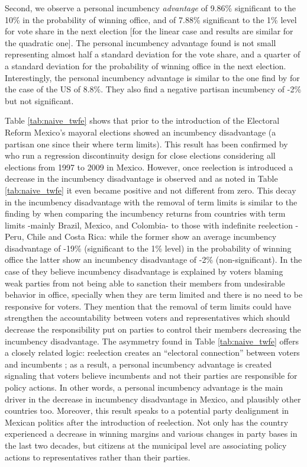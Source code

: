 Second, we observe a personal incumbency \emph{advantage} of 9.86\% significant to the 10\% in the probability of winning office, and of 7.88\% significant to the 1\% level for vote share in the next election [for the linear case and results are similar for the quadratic one]. The personal incumbency advantage found is not small representing almost half a standard deviation for the vote share, and a quarter of a standard deviation for the probability of winning office in the next election. Interestingly, the personal incumbency advantage is similar to the one find by \citet{fowler_hall_2014} for the case of the US of 8.8\%. They also find a negative partisan incumbency of -2\% but not significant.  

Table \ref{tab:naive_twfe} shows that prior to the introduction of the Electoral Reform Mexico's mayoral elections showed an incumbency disadvantage (a partisan one since their where term limits). This result has been confirmed by \citet{klasnja_titiunik_2017} who run a regression discontinuity design for close elections considering all elections from 1997 to 2009 in Mexico. However, once reelection is introduced a decrease in the incumbency disadvantage is observed and as noted in Table \ref{tab:naive_twfe} it even became positive and not different from zero. This decay in the incumbency disadvantage with the removal of term limits is similar to the finding by \citet{klasnja_titiunik_2017} when comparing the incumbency returns from countries with term limits -mainly Brazil, Mexico, and Colombia-  to those with indefinite reelection -Peru, Chile and Costa Rica: while the former show an average incumbency disadvantage of -19\% (significant to the 1\% level) in the probability of winning office the latter show an incumbency disadvantage of -2\% (non-significant). In the case of \citet{klasnja_titiunik_2017} they believe incumbency disadvantage is explained by voters blaming weak parties from not being able to sanction their members from undesirable behavior in office, specially when they are term limited and there is no need to be responsive for voters. They mention that the removal of term limits could have strengthen the accountability between voters and representatives which should decrease the responsibility put on parties to control their members decreasing the incumbency disadvantage. The asymmetry found in Table \ref{tab:naive_twfe} offers a closely related logic: reelection creates an ``electoral connection'' between voters and incumbents \citep{mayhew_1974}; as a result, a personal incumbency advantage is created signaling that voters believe incumbents and not their parties are responsible for policy actions. In other words, a personal incumbency advantage is the main driver in the decrease in incumbency disadvantage in Mexico, and plausibly other countries too. Moreover, this result speaks to a potential party dealignment in Mexican politics after the introduction of reelection. Not only has the country experienced a decrease in winning margins and various changes in party bases in the last two decades, but citizens at the municipal level are associating policy actions to representatives rather than their parties.   



